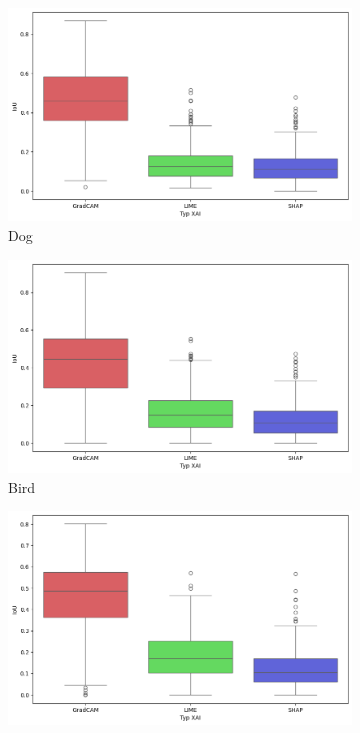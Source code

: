 \begin{figure}[h]
	\centering
	\begin{subfigure}[b]{0.3\textwidth}
		\includegraphics[width=.9\textwidth]{img/base_iou_dog}
		\caption{Dog}
	\end{subfigure}
	\begin{subfigure}[b]{0.3\textwidth}
		\centering\includegraphics[width=.9\textwidth]{img/base_iou_bird}
		\caption{Bird}
	\end{subfigure}
	\begin{subfigure}[b]{0.3\textwidth}
		\centering\includegraphics[width=.9\textwidth]{img/base_iou_vehicle}

\end{subfigure}
\end{figure}
